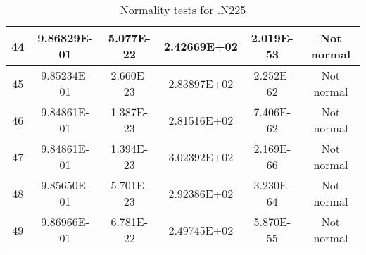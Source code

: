 \begin{table}[h]
\begin{tabular}{|c|c|c|c|c|c|}
		44 & 9.86829E-01 & 5.077E-22 & 2.42669E+02 & 2.019E-53 & Not normal\\\hline
		45 & 9.85234E-01 & 2.660E-23 & 2.83897E+02 & 2.252E-62 & Not normal\\\hline
		46 & 9.84861E-01 & 1.387E-23 & 2.81516E+02 & 7.406E-62 & Not normal\\\hline
		47 & 9.84861E-01 & 1.394E-23 & 3.02392E+02 & 2.169E-66 & Not normal\\\hline
		48 & 9.85650E-01 & 5.701E-23 & 2.92386E+02 & 3.230E-64 & Not normal\\\hline
		49 & 9.86966E-01 & 6.781E-22 & 2.49745E+02 & 5.870E-55 & Not normal\\\hline
	\end{tabular}
	\caption{Normality tests for .N225}
	\label{tab:normality_tests_N225}
\end{table}
